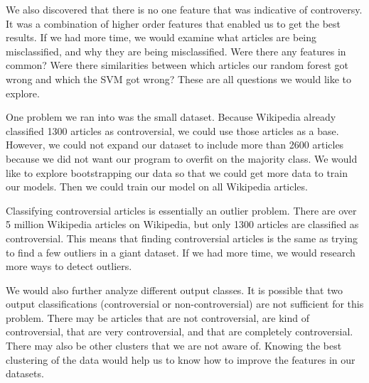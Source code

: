 \documentclass{article}
\begin{document}
We also discovered that there is no one feature that was indicative of controversy. It was a combination of higher order features that enabled us to get the best results. If we had more time, we would examine what articles are being misclassified, and why they are being misclassified. Were there any features in common? Were there similarities between which articles our random forest got wrong and which the SVM got wrong? These are all questions we would like to explore. 

One problem we ran into was the small dataset. Because Wikipedia already classified 1300 articles as controversial, we could use those articles as a base. However, we could not expand our dataset to include more than 2600 articles because we did not want our program to overfit on the majority class. We would like to explore bootstrapping our data so that we could get more data to train our models. Then we could train our model on all Wikipedia articles.

Classifying controversial articles is essentially an outlier problem. There are over 5 million Wikipedia articles on Wikipedia, but only 1300 articles are classified as controversial. This means that finding controversial articles is the same as trying to find a few outliers in a giant dataset. If we had more time, we would research more ways to detect outliers.

We would also further analyze different output classes. It is possible that two output classifications (controversial or non-controversial) are not sufficient for this problem. There may be articles that are not controversial, are kind of controversial, that are very controversial, and that are completely controversial. There may also be other clusters that we are not aware of. Knowing the best clustering of the data would help us to know how to improve the features in our datasets.




\end{document}

